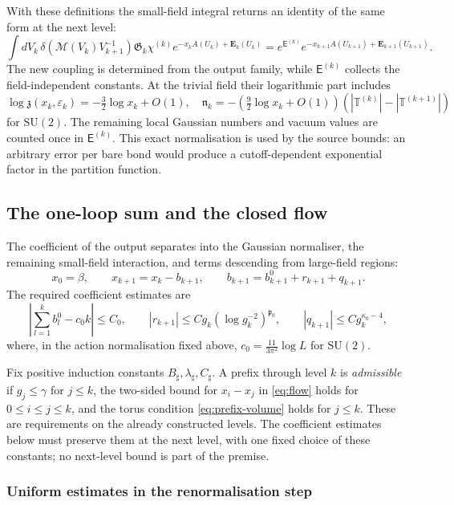 \documentclass[11pt,letterpaper,reqno]{amsart}
\theoremstyle{definition}
\theoremstyle{remark}
\newcommand{\SU}{\mathrm{SU}}
\begin{document}
With these definitions the small-field integral returns an
identity of the same form at the next level:
\[
 \int dV_k\,
 \delta(\mathcal M(V_k)V_{k+1}^{-1})\mathfrak G_k\chi^{(k)}
 e^{-x_kA(U_k)+\mathbf E_k(U_k)}
 =e^{\mathsf E^{(k)}}
   e^{-x_{k+1}A(U_{k+1})+\mathbf E_{k+1}(U_{k+1})}.
\]
The new coupling is determined from the output family, while
$\mathsf E^{(k)}$ collects the field-independent constants.
At the trivial field their logarithmic part includes
\[
 \log\mathfrak z(x_k,\varepsilon_k)
   =-\tfrac32\log x_k+O(1),
 \quad
 \mathfrak n_k=
 -\left(\tfrac92\log x_k+O(1)\right)
       (|\mathbb T^{(k)}|-|\mathbb T^{(k+1)}|)
\]
for $\SU(2)$. The remaining local Gaussian numbers and vacuum
values are counted once in $\mathsf E^{(k)}$. This exact
normalisation is used by the source bounds: an arbitrary error
per bare bond would produce a cutoff-dependent exponential
factor in the partition function.

\subsection{The one-loop sum and the closed flow}

The coefficient of the output separates into the Gaussian
normaliser, the remaining small-field interaction, and terms
descending from large-field regions:
\begin{equation}\label{eq:increment}
 x_0=\beta,\qquad x_{k+1}=x_k-b_{k+1},\qquad
 b_{k+1}=b^0_{k+1}+r_{k+1}+q_{k+1}.
\end{equation}
The required coefficient estimates are
\begin{equation}\label{eq:flow-estimates}
 \left|\sum_{l=1}^k b_l^0-c_0k\right|\le C_0,
 \qquad |r_{k+1}|\le Cg_k(\log g_k^{-2})^{\mathfrak p_0},
 \qquad |q_{k+1}|\le Cg_k^{\kappa_0-4},
\end{equation}
where, in the action normalisation fixed above,
$c_0=\frac{11}{3\pi^2}\log L$ for $\SU(2)$.

Fix positive induction constants
$B_\sharp,\lambda_\sharp,C_\sharp$. A prefix through level $k$ is
\emph{admissible} if $g_j\le\gamma$ for $j\le k$, the two-sided
bound for $x_i-x_j$ in \eqref{eq:flow} holds for
$0\le i\le j\le k$, and the torus condition
\eqref{eq:prefix-volume} holds for $j\le k$. These are requirements
on the already constructed levels. The coefficient estimates below
must preserve them at the next level, with one fixed choice of these
constants; no next-level bound is part of the premise.

\subsubsection*{Uniform estimates in the renormalisation step}
\label{hyp:uniform-rg}
\end{document}
